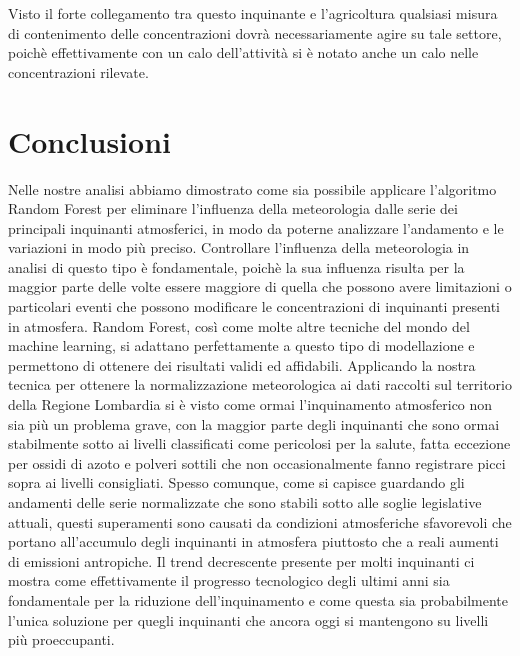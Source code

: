 \documentclass[a4paper,12pt]{report}
\begin{document}
Visto il forte collegamento tra questo inquinante e l'agricoltura qualsiasi misura di contenimento delle concentrazioni dovrà necessariamente agire su tale settore, poichè effettivamente con un calo dell'attività si è notato anche un calo nelle concentrazioni rilevate.

\chapter{Conclusioni}
Nelle nostre analisi abbiamo dimostrato come sia possibile applicare l'algoritmo Random Forest per eliminare l'influenza della meteorologia dalle serie dei principali inquinanti atmosferici, in modo da poterne analizzare l'andamento e le variazioni in modo più preciso.  
Controllare l'influenza della meteorologia in analisi di questo tipo è fondamentale, poichè la sua influenza risulta per la maggior parte delle volte essere maggiore di quella che possono avere limitazioni o particolari eventi che possono modificare le concentrazioni di inquinanti presenti in atmosfera. Random Forest, così come molte altre tecniche del mondo del machine learning, si adattano perfettamente a questo tipo di modellazione e permettono di ottenere dei risultati validi ed affidabili.  
Applicando la nostra tecnica per ottenere la normalizzazione meteorologica ai dati raccolti sul territorio della Regione Lombardia si è visto come ormai l'inquinamento atmosferico non sia più un problema grave, con la maggior parte degli inquinanti che sono ormai stabilmente sotto ai livelli classificati come pericolosi per la salute, fatta eccezione per ossidi di azoto e polveri sottili che non occasionalmente fanno registrare picci sopra ai livelli consigliati. Spesso comunque, come si capisce guardando gli andamenti delle serie normalizzate che sono stabili sotto alle soglie legislative attuali, questi superamenti sono causati da condizioni atmosferiche sfavorevoli che portano all'accumulo degli inquinanti in atmosfera piuttosto che a reali aumenti di emissioni antropiche.  
Il trend decrescente presente per molti inquinanti ci mostra come effettivamente il progresso tecnologico degli ultimi anni sia fondamentale per la riduzione dell'inquinamento e come questa sia probabilmente l'unica soluzione per quegli inquinanti che ancora oggi si mantengono su livelli più proeccupanti.  
\end{document}
